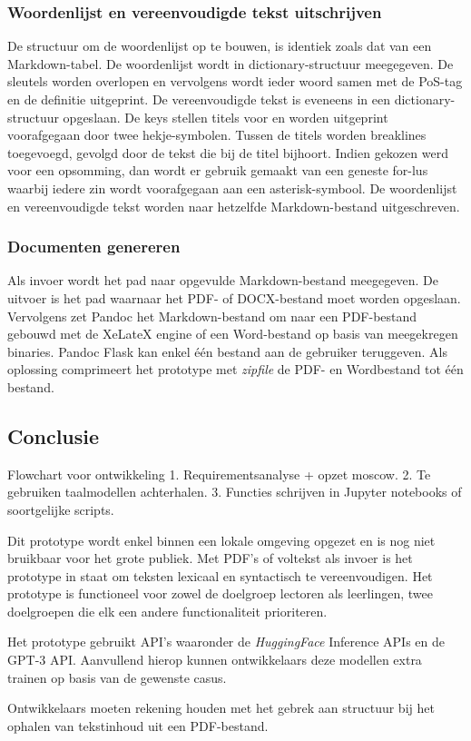 \subsubsection{Woordenlijst en vereenvoudigde tekst uitschrijven}

De structuur om de woordenlijst op te bouwen, is identiek zoals dat van een Markdown-tabel. De  woordenlijst wordt in dictionary-structuur meegegeven. De sleutels worden overlopen en vervolgens wordt ieder woord samen met de PoS-tag en de definitie uitgeprint. De vereenvoudigde tekst is eveneens in een dictionary-structuur opgeslaan. De keys stellen titels voor en worden uitgeprint voorafgegaan door twee hekje-symbolen. Tussen de titels worden breaklines toegevoegd, gevolgd door de tekst die bij de titel bijhoort. Indien gekozen werd voor een opsomming, dan wordt er gebruik gemaakt van een geneste for-lus waarbij iedere zin wordt voorafgegaan aan een asterisk-symbool. De woordenlijst en vereenvoudigde tekst worden naar hetzelfde Markdown-bestand uitgeschreven. 

\subsubsection{Documenten genereren}

Als invoer wordt het pad naar opgevulde Markdown-bestand meegegeven. De uitvoer is het pad waarnaar het PDF- of DOCX-bestand moet worden opgeslaan. Vervolgens zet Pandoc het Markdown-bestand om naar een PDF-bestand gebouwd met de XeLateX engine of een Word-bestand op basis van meegekregen binaries. Pandoc Flask kan enkel één bestand aan de gebruiker teruggeven. Als oplossing comprimeert het prototype met \textit{zipfile} de PDF- en Wordbestand tot één bestand. 

\subsection{Conclusie}

Flowchart voor ontwikkeling
1. Requirementsanalyse + opzet moscow.
2. Te gebruiken taalmodellen achterhalen.
3. Functies schrijven in Jupyter notebooks of soortgelijke scripts.

Dit prototype wordt enkel binnen een lokale omgeving opgezet en is nog niet bruikbaar voor het grote publiek. Met PDF's of voltekst als invoer is het prototype in staat om teksten lexicaal en syntactisch te vereenvoudigen. Het prototype is functioneel voor zowel de doelgroep lectoren als leerlingen, twee doelgroepen die elk een andere functionaliteit prioriteren. 

\medspace

Het prototype gebruikt API's waaronder de \textit{HuggingFace} Inference APIs en de GPT-3 API. Aanvullend hierop kunnen ontwikkelaars deze modellen extra trainen op basis van de gewenste casus. 

\medspace

Ontwikkelaars moeten rekening houden met het gebrek aan structuur bij het ophalen van tekstinhoud uit een PDF-bestand.